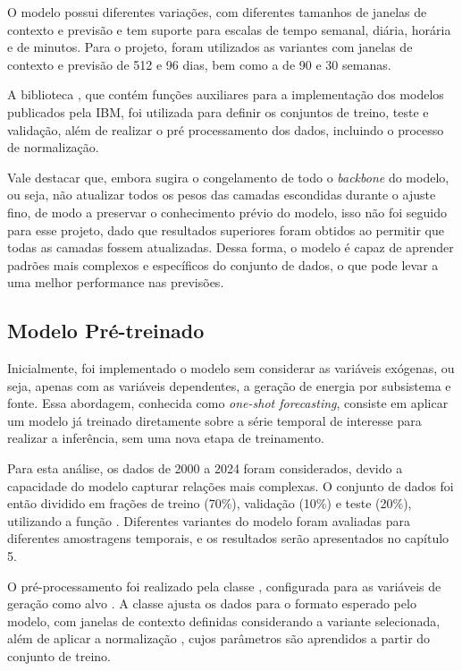 O modelo possui diferentes variações, com diferentes tamanhos de janelas de contexto e previsão e tem suporte para escalas 
de tempo semanal, diária, horária e de minutos. Para o projeto, foram utilizados as variantes com janelas de contexto e 
previsão de 512 e 96 dias, bem como a de 90 e 30 semanas.

A biblioteca , que contém funções auxiliares para a implementação dos modelos publicados pela IBM, foi
utilizada para definir os conjuntos de treino, teste e validação, além de realizar o pré processamento dos dados, incluindo o
processo de normalização.

Vale destacar que, embora  sugira o congelamento de todo o \textit{backbone} do modelo, ou seja, 
não atualizar todos os pesos das camadas escondidas durante o ajuste fino, de modo a preservar o conhecimento prévio do modelo,
isso não foi seguido para esse projeto, dado que resultados superiores foram obtidos ao permitir que todas as camadas 
fossem atualizadas. Dessa forma, o modelo é capaz de aprender padrões mais complexos e específicos do conjunto de dados, 
o que pode levar a uma melhor performance nas previsões.

\subsection{Modelo Pré-treinado} %
Inicialmente, foi implementado o modelo sem considerar as variáveis exógenas, ou seja, apenas com as variáveis dependentes, a 
geração de energia por subsistema e fonte. Essa abordagem, conhecida como \textit{one-shot forecasting}, consiste em aplicar 
um modelo já treinado diretamente sobre a série temporal de interesse para realizar a inferência, sem uma nova etapa de treinamento.

Para esta análise, os dados de 2000 a 2024 foram considerados, devido a capacidade do modelo capturar relações mais complexas. 
O conjunto de dados foi então dividido em frações de treino (70\%), validação (10\%) e teste (20\%), utilizando a função 
. Diferentes variantes do modelo foram avaliadas para diferentes amostragens temporais, e os resultados 
serão apresentados no capítulo 5.

O pré-processamento foi realizado pela classe , configurada para as variáveis de geração como 
alvo . A classe ajusta os dados para o formato esperado pelo modelo, com janelas de contexto definidas
considerando a variante selecionada, além de aplicar a normalização , cujos parâmetros são aprendidos 
a partir do conjunto de treino.

